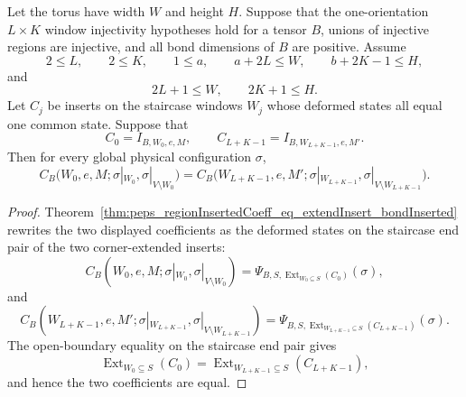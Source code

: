 \begin{theorem}
    \label{thm:peps_regionInsertedCoeff_endWindows_eq_of_staircase}
    \leanok
    Let the torus have width $W$ and height $H$.
    Suppose that the one-orientation $L\times K$ window injectivity
    hypotheses hold for a tensor $B$, unions of injective regions are
    injective, and all bond dimensions of $B$ are positive.  Assume
    \[
        2\le L,\qquad 2\le K,\qquad 1\le a,\qquad
        a+2L\le W,\qquad b+2K-1\le H,
    \]
    and
    \[
        2L+1\le W,\qquad 2K+1\le H.
    \]
    Let $C_j$ be inserts on the staircase windows $W_j$ whose deformed states
    all equal one common state.  Suppose that
    \[
        C_0=I_{B,W_0,e,M},
        \qquad
        C_{L+K-1}=I_{B,W_{L+K-1},e,M'}.
    \]
    Then for every global physical configuration $\sigma$,
    \[
        C_B\bigl(W_0,e,M;\sigma|_{W_0},\sigma|_{V\setminus W_0}\bigr)
        =
        C_B\bigl(W_{L+K-1},e,M';
            \sigma|_{W_{L+K-1}},\sigma|_{V\setminus W_{L+K-1}}\bigr).
    \]
\end{theorem}
\begin{proof}
    \leanok
    Theorem~\ref{thm:peps_regionInsertedCoeff_eq_extendInsert_bondInserted}
    rewrites the two displayed coefficients as the deformed states on the
    staircase end pair of the two corner-extended inserts:
    \[
        C_B(W_0,e,M;\sigma|_{W_0},\sigma|_{V\setminus W_0})
        =
        \Psi_{B,S,\operatorname{Ext}_{W_0\subseteq S}(C_0)}(\sigma),
    \]
    and
    \[
        C_B(W_{L+K-1},e,M';
            \sigma|_{W_{L+K-1}},\sigma|_{V\setminus W_{L+K-1}})
        =
        \Psi_{B,S,
        \operatorname{Ext}_{W_{L+K-1}\subseteq S}(C_{L+K-1})}(\sigma).
    \]
    The open-boundary equality on the staircase end pair gives
    \[
        \operatorname{Ext}_{W_0\subseteq S}(C_0)
        =
        \operatorname{Ext}_{W_{L+K-1}\subseteq S}(C_{L+K-1}),
    \]
    and hence the two coefficients are equal.
\end{proof}



